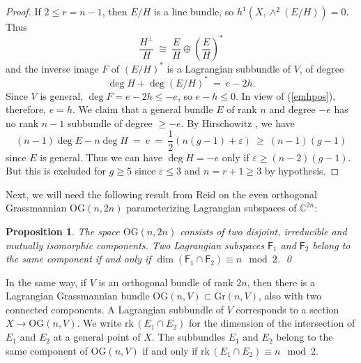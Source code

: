 \documentclass[10pt]{amsart}
\numberwithin{equation}{section}
\newcommand{\cc}{\mathbb C}
\newcommand{\rank}{\mathrm{rk}\,}
\newcommand{\Gr}{\mathrm{Gr}}
\newcommand{\OG}{\mathrm{OG}}
\newtheorem{prop}[theorem]{{\textbf Proposition}}
\begin{document}
\begin{proof}
If $2 \le r = n-1$, then $E/H$ is a line bundle, so $h^1 (X, \wedge^2 (E/H)) = 0$. Thus
\[ \frac{H^\perp}{H} \ \cong \ \frac{E}{H} \oplus \left( \frac{E}{H} \right)^* \]
and the inverse image $F$ of $(E/H)^*$ is a Lagrangian subbundle of $V$, of degree
\[ \deg H + \deg (E/H)^* \ = \ %
 e - 2h. \]
Since $V$ is general, $\deg F = e - 2h \le -e$, so $e-h \le 0$. In view of (\ref{emhpos}), therefore, $e = h$. We claim that a general bundle $E$ of rank $n$ and degree $-e$ has no rank $n-1$ subbundle of degree $\ge -e$. By Hirschowitz \cite[Th\'eor\`eme 4.4]{Hir}, we have
\[ (n-1) \deg E - n \deg H \ = \ e \ = \ \frac{1}{2} \left( n(g-1) + \varepsilon \right) \ \ge \ (n-1)(g-1) \]
since $E$ is general. Thus we can have $\deg H = -e$ only if $\varepsilon \ge (n-2)(g-1)$. 
 But this is excluded for $g \ge 5$ since $\varepsilon \le 3$ and $n = r+1 \ge 3$ by hypothesis. \end{proof}

Next, we will need the following result from Reid \cite[\S 1]{Reid} on the even orthogonal Grassmannian $\OG(n,2n)$ parameterizing Lagrangian subspaces of $\cc^{2n}$:

\begin{prop} \label{OG} The space $\OG(n, 2n)$ consists of two disjoint, irreducible and mutually isomorphic components. Two Lagrangian subspaces $\mathsf{F}_1$ and $\mathsf{F}_2$ belong to the same component if and only if $\dim \left( \mathsf{F}_1 \cap \mathsf{F}_2 \right) \equiv n \mod 2$. \qed \end{prop}

In the same way, if $V$ is an orthogonal bundle of rank $2n$, then there is a Lagrangian Grassmannian bundle $\OG(n, V) \subset \Gr(n, V)$, also with two connected components. 
 A Lagrangian subbundle of $V$ corresponds to a section $X \to \OG(n, V)$. We write $\rank ( E_1 \cap E_2 )$ for the dimension of the intersection of $E_1$ and $E_2$ at a general point of $X$. The subbundles $E_1$ and $E_2$ belong to the same component of $\OG(n, V)$ if and only if $\rank (E_1 \cap E_2) \equiv n \mod 2$.
\end{document}
